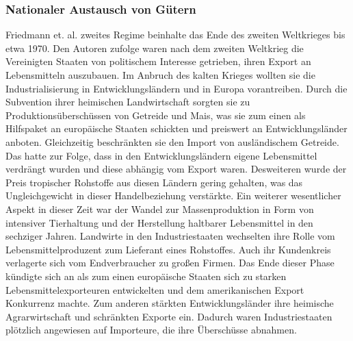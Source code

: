 \documentclass{scrartcl}
\begin{document}
\subsubsection*{Nationaler Austausch von Gütern}
Friedmann et. al. zweites Regime beinhalte das Ende des zweiten Weltkrieges bis etwa 1970. Den Autoren zufolge waren nach dem zweiten Weltkrieg die Vereinigten Staaten von politischem Interesse getrieben, ihren Export an Lebensmitteln auszubauen. Im Anbruch des kalten Krieges wollten sie die Industrialisierung in Entwicklungsländern und in Europa vorantreiben. Durch die Subvention ihrer heimischen Landwirtschaft sorgten sie zu Produktionsüberschüssen von Getreide und Mais, was sie zum einen als Hilfspaket an europäische Staaten schickten und preiswert an Entwicklungsländer anboten. Gleichzeitig beschränkten sie den Import von ausländischem Getreide. Das hatte zur Folge, dass in den Entwicklungsländern eigene Lebensmittel verdrängt wurden und diese abhängig vom Export waren. Desweiteren wurde der Preis tropischer Rohstoffe aus diesen Ländern gering gehalten, was das Ungleichgewicht in dieser Handelbeziehung verstärkte. Ein weiterer wesentlicher Aspekt in dieser Zeit war der Wandel zur Massenproduktion in Form von intensiver Tierhaltung und der Herstellung haltbarer Lebensmittel in den sechziger Jahren. Landwirte in den Industriestaaten wechselten ihre Rolle vom Lebensmittelproduzent zum Lieferant eines Rohstoffes. Auch ihr Kundenkreis verlagerte sich vom Endverbraucher zu großen Firmen. Das Ende dieser Phase kündigte sich an als zum einen europäische Staaten sich zu starken Lebensmittelexporteuren entwickelten und dem amerikanischen Export Konkurrenz machte. Zum anderen stärkten Entwicklungsländer ihre heimische Agrarwirtschaft und schränkten Exporte ein. Dadurch waren Industriestaaten plötzlich angewiesen auf Importeure, die ihre Überschüsse abnahmen.
\end{document}
